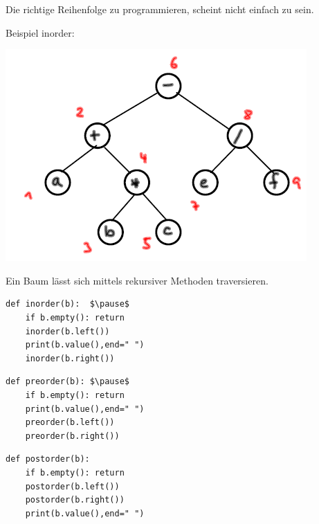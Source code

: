 \documentclass{beamer}
\begin{document}
\begin{frame}[fragile]
Die richtige Reihenfolge zu programmieren, scheint nicht einfach zu sein.

Beispiel inorder:

 \includegraphics[scale=0.8]{bild11.png} 
\end{frame}

\begin{frame}[fragile]
Ein Baum lässt sich mittels rekursiver Methoden traversieren.  

\begin{lstlisting}
def inorder(b):  $\pause$
    if b.empty(): return
    inorder(b.left())
    print(b.value(),end=" ")
    inorder(b.right())
\end{lstlisting} 

\begin{lstlisting}
def preorder(b): $\pause$
    if b.empty(): return 
    print(b.value(),end=" ")
    preorder(b.left())
    preorder(b.right())
\end{lstlisting} 

\begin{lstlisting}
def postorder(b):
    if b.empty(): return
    postorder(b.left())
    postorder(b.right())
    print(b.value(),end=" ")
\end{lstlisting} 

\end{frame}
\end{document}
